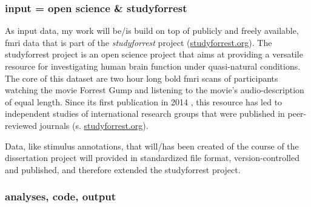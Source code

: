 \subsubsection{input = open science \& studyforrest}


As input data, my work will be/is build on top of publicly and freely available,
\ac{fmri} data that is part of the \textit{studyforrest} project
(\href{www.studyforrest.org}{studyforrest.org}).
%
The studyforrest project is an open science project that aims at providing a
versatile resource for investigating human brain function under quasi-natural
conditions.
%
The core of this dataset are two hour long \ac{bold} \ac{fmri} scans of
participants watching the movie Forrest Gump and listening to the movie's
audio-description of equal length.
%
Since its first publication in 2014 \citep{hanke2014audiomovie}, this resource
has led to independent studies of international research groups that were
published in peer-reviewed journals (s.
\href{www.studyforrest.org}{studyforrest.org}).

\begin{comment} \citep{dupre2020nature}:
%
Study Forrest is a data collection and curation effort designed to serve as a
    community resource for new discoveries.
%
As of October 2019, 29 unique studies had been published using the
    studyforrest.org dataset, 17 of which were published without any of the
    original authors of the data release.
%
This is possible in large part thanks to the richness of naturalistic stimuli,
    where the same movie can be used for both task-free as well as
    stimulus-driven analyses, with the original stimulus re-annotated for
    particular features of interest.
%
For example, studyforrest.org has been used to test cerebrovascular biomarkers
    (Voss et al., 2017) but, among other features, was also annotated for
    expressed emotion (Labs et al., 2015) which later informed a study on
    emotion encoding gradients in the brain (Lettieri et al., 2019)''
    \citep{dupre2020nature}.
%
\end{comment}
%
Data, like stimulus annotations, that will/has been created of the course of the
dissertation project will provided in standardized file format,
version-controlled and published, and therefore extended the studyforrest
project.

%
\subsubsection{analyses, code, output}

